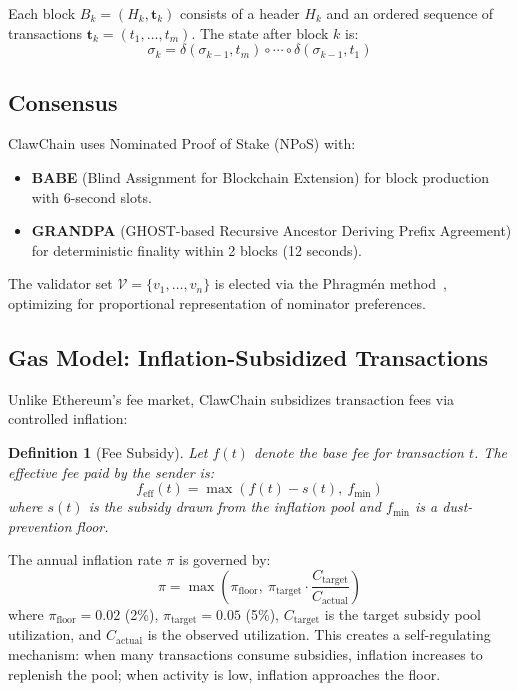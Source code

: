 \documentclass{article}
\newtheorem{definition}{Definition}
\begin{document}
Each block $B_k = (H_k, \mathbf{t}_k)$ consists of a header $H_k$ and an ordered sequence of transactions $\mathbf{t}_k = (t_1, \ldots, t_m)$. The state after block $k$ is:
\begin{equation}
    \sigma_k = \delta(\sigma_{k-1}, t_m) \circ \cdots \circ \delta(\sigma_{k-1}, t_1)
\end{equation}

\subsection{Consensus}

ClawChain uses Nominated Proof of Stake (NPoS) with:
\begin{itemize}
    \item \textbf{BABE} (Blind Assignment for Blockchain Extension) for block production with 6-second slots.
    \item \textbf{GRANDPA} (GHOST-based Recursive Ancestor Deriving Prefix Agreement) for deterministic finality within 2 blocks (12 seconds).
\end{itemize}

The validator set $\mathcal{V} = \{v_1, \ldots, v_n\}$ is elected via the Phragm\'{e}n method~\cite{brill2017phragmen}, optimizing for proportional representation of nominator preferences.

\subsection{Gas Model: Inflation-Subsidized Transactions}

Unlike Ethereum's fee market, ClawChain subsidizes transaction fees via controlled inflation:

\begin{definition}[Fee Subsidy]
Let $f(t)$ denote the base fee for transaction $t$. The effective fee paid by the sender is:
\begin{equation}
    f_{\text{eff}}(t) = \max\left(f(t) - s(t),\ f_{\min}\right)
\end{equation}
where $s(t)$ is the subsidy drawn from the inflation pool and $f_{\min}$ is a dust-prevention floor.
\end{definition}

The annual inflation rate $\pi$ is governed by:
\begin{equation}
    \pi = \max\left(\pi_{\text{floor}},\ \pi_{\text{target}} \cdot \frac{C_{\text{target}}}{C_{\text{actual}}}\right)
\end{equation}
where $\pi_{\text{floor}} = 0.02$ (2\%), $\pi_{\text{target}} = 0.05$ (5\%), $C_{\text{target}}$ is the target subsidy pool utilization, and $C_{\text{actual}}$ is the observed utilization. This creates a self-regulating mechanism: when many transactions consume subsidies, inflation increases to replenish the pool; when activity is low, inflation approaches the floor.
\end{document}
